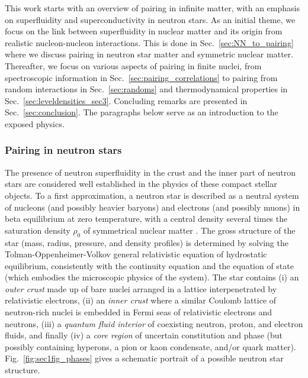 \documentclass[rmp,aps,floatfix]{revtex4}
\begin{document}
This work starts with an overview of pairing in infinite matter, with an 
emphasis on superfluidity and superconductivity in neutron stars.
As an initial theme, we focus on the link between superfluidity 
in nuclear matter 
and its origin from realistic nucleon-nucleon interactions. 
This is done 
in Sec.~\ref{sec:NN_to_pairing} where we discuss pairing in neutron star
matter and symmetric nuclear matter.
Thereafter, we focus on various aspects of pairing in finite nuclei, from
spectroscopic information in Sec.~\ref{sec:pairing_correlations}
to pairing from random interactions in Sec.~\ref{sec:randoms}
and thermodynamical properties in Sec.~\ref{sec:leveldensities_sec3}.
Concluding remarks are presented in Sec.~\ref{sec:conclusion}.
The paragraphs below serve as an introduction to the  exposed physics.



\subsubsection{Pairing in neutron stars}
\label{subsubsect:neutron_stars}

The presence of neutron superfluidity in 
the crust and the inner part 
of neutron stars 
are considered well established 
in the physics of these compact stellar objects. 
To a first approximation, a neutron star 
is described as a neutral system of nucleons (and possibly heavier baryons) 
and electrons (and possibly muons) in beta equilibrium at zero temperature, 
with a central density several times the saturation density $\rho_0$ 
of symmetrical nuclear matter \cite{hh2000,pethick1992,shapiro,lamb,fiks,alparlives}. 
The gross structure of the star (mass, radius, pressure, and density 
profiles) is determined by solving the Tolman-Oppenheimer-Volkov general 
relativistic equation of hydrostatic equilibrium, consistently with 
the continuity equation and the equation of state (which embodies the 
microscopic physics of the system).  The star contains (i) an {\it outer 
crust} made up of bare nuclei arranged in a lattice interpenetrated 
by relativistic electrons, (ii) an {\it inner crust} where a similar 
Coulomb lattice of neutron-rich nuclei is embedded in Fermi seas of 
relativistic electrons and neutrons, (iii) a {\it quantum fluid interior} 
of coexisting neutron, proton, and electron fluids, and finally 
(iv) a {\it core region} of uncertain constitution and phase (but 
possibly containing hyperons, a pion or kaon condensate, and/or quark matter).
Fig.~\ref{fig:sec1fig_phases} gives a schematic portrait of a 
possible neutron star structure.
\end{document}
